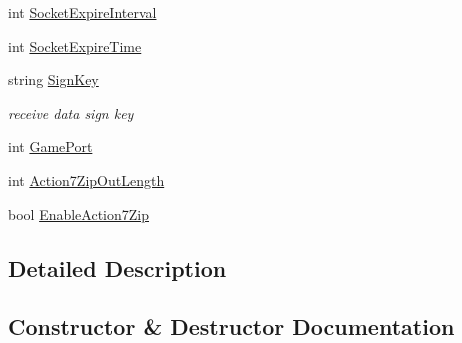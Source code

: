 \begin{DoxyCompactItemize}
int \mbox{\hyperlink{class_t_net_1_1_config_1_1_protocol_section_a4d9bb521210375230589475941b5b203}{Socket\+Expire\+Interval}}
\item 
int \mbox{\hyperlink{class_t_net_1_1_config_1_1_protocol_section_a385a93ccd605591ac61f001060d09c6f}{Socket\+Expire\+Time}}
\item 
string \mbox{\hyperlink{class_t_net_1_1_config_1_1_protocol_section_a13a0786ecde058e7b51d030879e04782}{Sign\+Key}}
\begin{DoxyCompactList}\small\item\em receive data sign key \end{DoxyCompactList}\item 
int \mbox{\hyperlink{class_t_net_1_1_config_1_1_protocol_section_adfa55f865307067cfd3874b0bf79cdb9}{Game\+Port}}
\item 
int \mbox{\hyperlink{class_t_net_1_1_config_1_1_protocol_section_ac1aa6e9be874d81f56f54c1ba49298be}{Action7\+Zip\+Out\+Length}}
\item 
bool \mbox{\hyperlink{class_t_net_1_1_config_1_1_protocol_section_a174a92ac4da542fa64ba4561fdf10fdb}{Enable\+Action7\+Zip}}
\end{DoxyCompactItemize}


\subsection{Detailed Description}




\subsection{Constructor \& Destructor Documentation}
\mbox{\label{class_t_net_1_1_config_1_1_protocol_section_a9f3b2d889f2fc72ace52a021be91b901}} 
